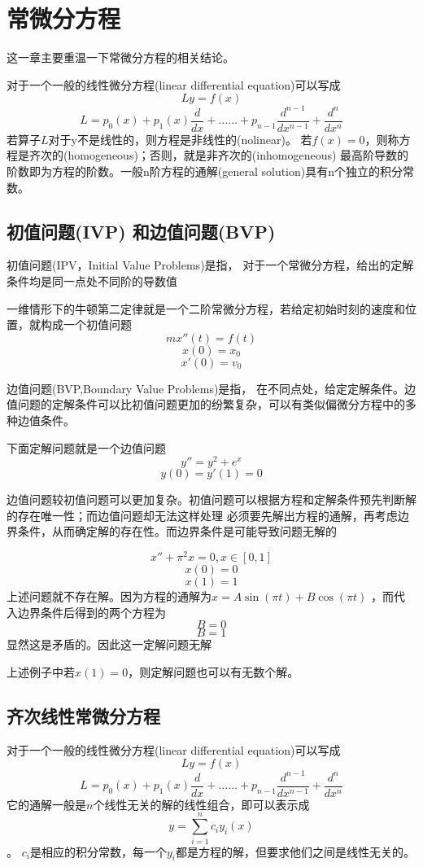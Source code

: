 \chapter{常微分方程}
这一章主要重温一下常微分方程的相关结论。

对于一个一般的线性微分方程(linear differential equation)可以写成
\[Ly=f(x)\]
\[L=p_0(x)+p_1(x)\frac{d}{dx}+……+p_{n-1}\frac{d^{n-1}}{dx^{n-1}}+\frac{d^n}{dx^n}\]
若算子$L$对于y不是线性的，则方程是非线性的(nolinear)。
若$f(x)=0$，则称方程是齐次的(homogeneous)；否则，就是非齐次的(inhomogeneous)
最高阶导数的阶数即为方程的阶数。一般n阶方程的通解(general solution)具有n个独立的积分常数。
\section{初值问题(IVP) 和边值问题(BVP)}

初值问题(IPV，Initial Value Problems)是指，
对于一个常微分方程，给出的定解条件均是同一点处不同阶的导数值
\begin{example}
    一维情形下的牛顿第二定律就是一个二阶常微分方程，若给定初始时刻的速度和位置，就构成一个初值问题
    \[mx''(t)=f(t)\]
    \[x(0)=x_0\]
    \[x'(0)=v_0\]
\end{example}

边值问题(BVP,Boundary Value Problems)是指，
在不同点处，给定定解条件。边值问题的定解条件可以比初值问题更加的纷繁复杂，可以有类似偏微分方程中的多种边值条件。
\begin{example}
    下面定解问题就是一个边值问题
    \[y''=y^2+e^x\]
    \[y(0)=y'(1)=0\]
\end{example}

边值问题较初值问题可以更加复杂。初值问题可以根据方程和定解条件预先判断解的存在唯一性；而边值问题却无法这样处理
必须要先解出方程的通解，再考虑边界条件，从而确定解的存在性。而边界条件是可能导致问题无解的
\begin{example}
    \[x''+\pi^2x=0,      x\in[0,1]\]
    \[x(0)=0\]
    \[x(1)=1\]
    上述问题就不存在解。因为方程的通解为$x=A\sin(\pi t)+B\cos(\pi t)$
    ，而代入边界条件后得到的两个方程为\[B=0\]\[B=1\]显然这是矛盾的。因此这一定解问题无解
\end{example}
上述例子中若$x(1)=0$，则定解问题也可以有无数个解。

\section{齐次线性常微分方程}
对于一个一般的线性微分方程(linear differential equation)可以写成
\[Ly=f(x)\]
\[L=p_0(x)+p_1(x)\frac{d}{dx}+……+p_{n-1}\frac{d^{n-1}}{dx^{n-1}}+\frac{d^n}{dx^n}\]
它的通解一般是$n$个线性无关的解的线性组合，即可以表示成\[y=\sum_{i=1}^nc_iy_i(x)\]。
$c_i$是相应的积分常数，每一个$y_i$都是方程的解，但要求他们之间是线性无关的。

